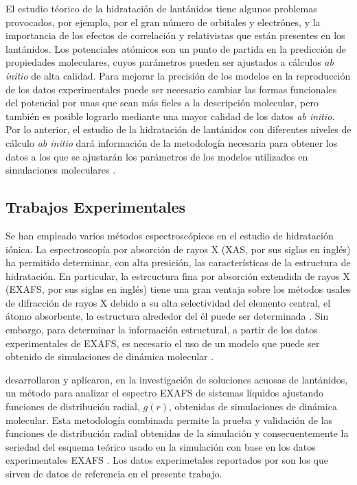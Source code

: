 El estudio t\'eorico de la hidrataci\'on de lant\'anidos tiene 
algunos problemas provocados, por ejemplo, por el gran n\'umero de
orbitales y electr\'ones, y la importancia de los efectos de 
correlaci\'on y relativistas que est\'an presentes en los 
lant\'anidos. Los potenciales at\'omicos son un punto de partida en 
la predicci\'on de propiedades moleculares, cuyos par\'ametros pueden
ser ajustados a c\'alculos {\it ab initio} de alta calidad. Para 
mejorar la precisi\'on de los modelos en la reproducci\'on de los 
datos experimentales puede ser necesario cambiar las formas 
funcionales del potencial por unas que sean m\'as fieles a la 
descripci\'on molecular, pero tambi\'en es posible lograrlo mediante
una mayor calidad de los datos {\it ab initio}. Por
lo anterior, el estudio de la hidrataci\'on de lant\'anidos con 
diferentes niveles de c\'alculo {\it ab initio} dar\'a informaci\'on
de la metodolog\'ia necesaria para obtener los datos a los que se
ajustar\'an los par\'ametros de los modelos utilizados en
simulaciones moleculares 	\citep{Cund1993,Sadu1999,Hern2005}.

\subsection{Trabajos Experimentales}
Se han empleado varios m\'etodos espectrosc\'opicos en el estudio de
hidrataci\'on i\'onica. La espectroscop\'ia por absorci\'on de rayos 
X (XAS, por sus siglas en ingl\' es) ha permitido determinar, con 
alta presici\'on, las caracter\'isticas de la estructura de 
hidrataci\'on. En particular, la estrcuctura fina por absorci\'on 
extendida de rayos X (EXAFS, por sus siglas en ingl\'es) tiene una 
gran ventaja sobre los m\'etodos usales de difracci\'on de rayos X 
debido a su alta selectividad del elemento central, el \'atomo 
absorbente, la estructura alrededor del \'el puede ser determinada
\citep{Ohta1993}. Sin embargo, para determinar la informaci\'on 
estructural, a partir de los datos experimentales de EXAFS, es 
necesario el uso de un modelo que puede ser obtenido de simulaciones 
de din\'amica molecular \citep{Dang2011}. 

\cite{Dang2011} desarrollaron y aplicaron, en la investigaci\'on de
soluciones acuosas de lant\'anidos, un m\'etodo para analizar 
el espectro EXAFS de sistemas l\'iquidos ajustando funciones de 
distribuci\'on radial, $g(r)$, obtenidas de simulaciones de 
din\'amica molecular. Esta metodolog\'ia combinada permite la prueba 
y validaci\'on de las funciones de distribuci\'on radial obtenidas de
la simulaci\'on y consecuentemente la seriedad del esquema te\'orico
usado en la simulaci\'on con base en los datos experimentales EXAFS 
\citep{Dang2012}. Los datos experimetales reportados por 
\cite{Dang2011} son los que sirven de datos de referencia en el 
presente trabajo.

